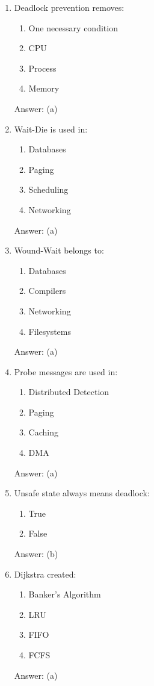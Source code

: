 \begin{enumerate}
\item Deadlock prevention removes:
\begin{enumerate}[label=(\alph*)]
\item One necessary condition
\item CPU
\item Process
\item Memory
\end{enumerate}
Answer: (a)

\item Wait-Die is used in:
\begin{enumerate}[label=(\alph*)]
\item Databases
\item Paging
\item Scheduling
\item Networking
\end{enumerate}
Answer: (a)

\item Wound-Wait belongs to:
\begin{enumerate}[label=(\alph*)]
\item Databases
\item Compilers
\item Networking
\item Filesystems
\end{enumerate}
Answer: (a)

\item Probe messages are used in:
\begin{enumerate}[label=(\alph*)]
\item Distributed Detection
\item Paging
\item Caching
\item DMA
\end{enumerate}
Answer: (a)

\item Unsafe state always means deadlock:
\begin{enumerate}[label=(\alph*)]
\item True
\item False
\end{enumerate}
Answer: (b)

\item Dijkstra created:
\begin{enumerate}[label=(\alph*)]
\item Banker's Algorithm
\item LRU
\item FIFO
\item FCFS
\end{enumerate}
Answer: (a)


\end{enumerate}

